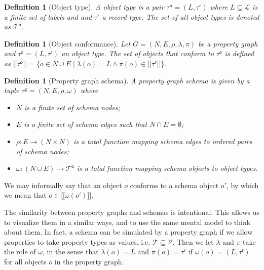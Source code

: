 \documentclass{article}
\newtheorem{definition}[theorem]{Definition}
\newcommand{\ptypes}{\mathcal{T}}
\newcommand{\rtype}{\tau^\mathsf{r}}
\newcommand{\otype}{\tau^\mathsf{o}}
\newcommand{\otypes}{\mathcal{T}^\mathsf{o}}
\newcommand{\gtype}{\tau^\mathsf{g}}
\newcommand{\lsem}{\ensuremath{[\![}}
\newcommand{\rsem}{\ensuremath{]\!]}}
\newcommand{\sem}[1]{\ensuremath{\lsem #1 \rsem}}
\begin{document}
\begin{definition}[Object type]
  A \emph{object type} is a pair $\otype = (L, \rtype)$ where $L \subseteq \mathcal{L}$ is a finite set of labels and and $\rtype$ a record type. 
  The set of all object types is denoted as $\otypes$.
\end{definition}

\begin{definition}[Object conformance]
  Let $G = (N, E, \rho, \lambda, \pi)$ be a property graph and $\otype = (L, \rtype)$ an object type. The set of objects that \emph{conform} to $\otype$ is defined as $\sem{\otype} = \{o \in N \cup E \mid \lambda(o) = L \wedge \pi(o) \in \sem{\rtype}\}$.
\end{definition}

\begin{definition}[Property graph schema]
  \label{def:pg-schema}
  A \emph{property graph schema} is given by a tuple $\gtype = (N, E, \rho, \omega)$ where 
  \begin{itemize}
    \item $N$ is a finite set of schema nodes;
    \item $E$ is a finite set of schema edges such that $N \cap E = \emptyset$;
    \item $\rho : E \to (N \times N)$ is a total function mapping schema edges to ordered pairs of schema nodes;
    \item $\omega : (N \cup E) \to \otypes$ is a total function mapping schema objects to object types.
  \end{itemize}
\end{definition}

We may informally say that an object $o$ conforms to a schema object $o'$, by which we mean that $o \in \sem{\omega(o')}$.

The similarity between property graphs and schemas is intentional. This allows us to visualize them in a similar ways, and to use the same mental model to think about them. In fact, a schema can be simulated by a property graph if we allow properties to take property types as values, i.e. $\ptypes \subseteq \mathcal{V}$. Then we let $\lambda$ and $\pi$ take the role of $\omega$, in the sense that $\lambda(o) = L$ and $\pi(o) = \rtype$ if $\omega(o) = (L, \rtype)$ for all objects $o$ in the property graph.
\end{document}
